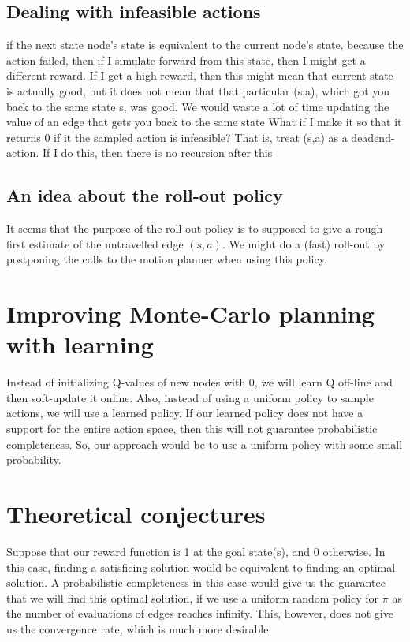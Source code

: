 \documentclass[10pt,letterpaper]{article}
\begin{document}
\subsection{Dealing with infeasible actions}
if the next state node's state is equivalent to the current 
node's state, because the action failed,
then if I simulate forward from this state, then I might get a different reward.
If I get a high reward, then this might mean that current state is actually good, but
it does not mean that that particular (s,a), which got you back to the same state s, was good.
We would waste a lot of time updating the value of an edge that gets you back to the same state
What if I make it so that it returns 0 if it the sampled action is infeasible? That is, treat
(s,a) as a deadend-action. If I do this, then there is no recursion after this


\subsection{An idea about the roll-out policy}
It seems that the purpose of the roll-out policy is to supposed
to give a rough first estimate of the untravelled edge $(s,a)$.
We might do a (fast) roll-out by postponing the calls to the motion
planner when using this policy.

\section{Improving Monte-Carlo planning with learning}
Instead of initializing Q-values of new nodes with 0, we will
learn Q off-line and then soft-update it online. Also, instead
of using a uniform policy to sample actions, we will use
a learned policy. If our learned policy does not have a support
for the entire action space, then this will not guarantee probabilistic
completeness. So, our approach would be to use a uniform policy
with some small probability.

\section{Theoretical conjectures}
Suppose that our reward function is 1 at the goal state(s), and 0 otherwise.
In this case, finding a satisficing solution would be equivalent to finding an optimal solution.
A probabilistic completeness in this case would give us the guarantee
that we will find this optimal solution, if we use a uniform random
policy for $\pi$ as the number of evaluations of edges reaches infinity. 
This, however, does not give us the convergence rate, 
which is much more desirable.
\end{document}
